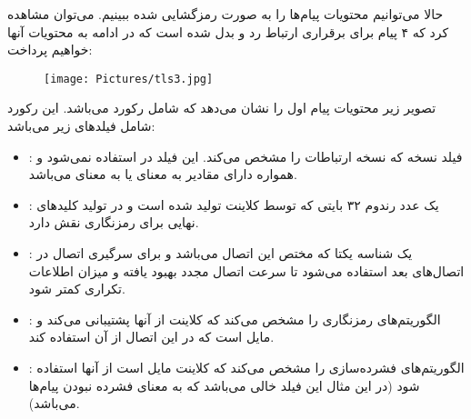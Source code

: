 \documentclass{report}
\begin{document}
\noindent
حالا می‌توانیم محتویات پیام‌ها را به صورت رمزگشایی شده ببینیم. می‌توان مشاهده کرد که ۴ پیام برای برقراری ارتباط  رد و بدل شده است که در ادامه به محتویات آنها خواهیم پرداخت:
\begin{figure}[H]
	\centering
	\texttt{[image: Pictures/tls3.jpg]}
	\label{tls3}
\end{figure}

تصویر زیر محتویات پیام اول را نشان می‌دهد که شامل رکورد  می‌باشد. این رکورد شامل فیلدهای زیر می‌باشد:
\begin{itemize}
	
	\item {}:
	فیلد نسخه که نسخه ارتباطات را مشخص می‌کند. این فیلد در  استفاده نمی‌شود و همواره دارای مقادیر  به معنای  یا  به معنای  می‌باشد.
	\item {}:
	یک عدد رندوم ۳۲ بایتی که توسط کلاینت تولید شده است و در تولید کلیدهای نهایی برای رمزنگاری نقش دارد.
	
	\item {}:
	یک شناسه یکتا که مختص این اتصال می‌باشد و برای سرگیری اتصال در اتصال‌های بعد استفاده می‌شود تا سرعت اتصال مجدد بهبود یافته و میزان اطلاعات تکراری کمتر شود.
	\item {}:
	الگوریتم‌های رمزنگاری را مشخص می‌کند که کلاینت از آنها پشتیبانی می‌کند و مایل است که در این اتصال از آن استفاده کند.
	\item {}:
	الگوریتم‌های فشرده‌سازی را مشخص می‌کند که کلاینت مایل است از آنها استفاده شود (در این مثال این فیلد خالی می‌باشد که به معنای فشرده نبودن پیام‌ها می‌باشد).
	
\end{itemize}
\end{document}
